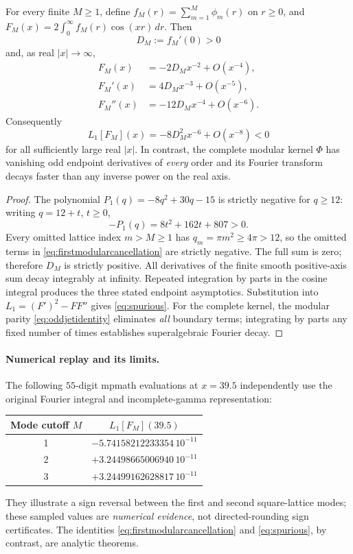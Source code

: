 \begin{theorem}
\label{thm:falsecutoff}
For every finite $M\ge1$, define
$f_M(r)=\sum_{m=1}^M\phi_m(r)$ on $r\ge0$,
and $F_M(x)=2\int_0^\infty f_M(r)\cos(xr)\,dr$.
Then
\[
D_M:=f_M'(0)>0
\]
and, as real $|x|\to\infty$,
\begin{align}
F_M(x)&=-2D_Mx^{-2}+O(x^{-4}),\nonumber\\
F_M'(x)&=4D_Mx^{-3}+O(x^{-5}),\nonumber\\
F_M''(x)&=-12D_Mx^{-4}+O(x^{-6}).
\end{align}
Consequently
\begin{equation}
\boxed{
L_1[F_M](x)
=-8D_M^2x^{-6}+O(x^{-8})<0
}
\label{eq:spurious}
\end{equation}
for all sufficiently large real $|x|$.
In contrast, the complete modular kernel $\Phi$
has vanishing odd endpoint derivatives of
\emph{every} order and its Fourier transform
decays faster than any inverse power
on the real axis.
\end{theorem}
\begin{proof}
The polynomial
$P_1(q)=-8q^2+30q-15$ is strictly negative
for $q\ge12$: writing $q=12+t$, $t\ge0$,
\[
-P_1(q)=8t^2+162t+807>0.
\]
Every omitted lattice index $m>M\ge1$
has $q_m=\pi m^2\ge4\pi>12$, so
the omitted terms in
\eqref{eq:firstmodularcancellation}
are strictly negative. The full sum is
zero; therefore $D_M$ is strictly positive.
All derivatives of the finite smooth
positive-axis sum decay integrably at
infinity. Repeated integration by parts
in the cosine integral produces the
three stated endpoint asymptotics.
Substitution into
$L_1=(F')^2-FF''$ gives \eqref{eq:spurious}.
For the complete kernel, the modular parity
\eqref{eq:oddjetidentity} eliminates
\emph{all} boundary terms; integrating
by parts any fixed number of times
establishes superalgebraic Fourier decay.
\end{proof}

\paragraph{Numerical replay and its limits.}
The following $55$-digit mpmath evaluations
at $x=39.5$ independently use the original
Fourier integral and incomplete-gamma
representation:
\begin{center}\small
\begin{tabular}{cc}
\hline
Mode cutoff $M$&$L_1[F_M](39.5)$\\
\hline
1 & $-5.74158212233354\,10^{-11}$\\
2 & $+3.24498665006940\,10^{-11}$\\
3 & $+3.24499162628817\,10^{-11}$\\
\hline
\end{tabular}
\end{center}
They illustrate a sign reversal between
the first and second square-lattice modes;
these sampled values are \emph{numerical
evidence}, not directed-rounding sign
certificates. The identities
\eqref{eq:firstmodularcancellation} and
\eqref{eq:spurious}, by contrast, are
analytic theorems.

